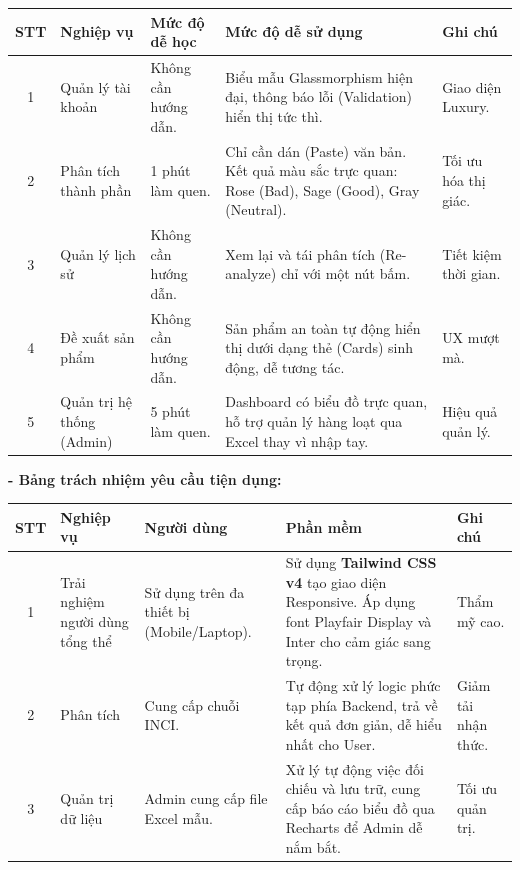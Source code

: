 \documentclass[12pt,a4paper]{article}
\begin{document}
\begin{center}
\renewcommand{\arraystretch}{1.3}
\begin{tabular}{|c|p{3.5cm}|p{3cm}|p{4.5cm}|p{2.5cm}|}
\hline
\textbf{STT} & \textbf{Nghiệp vụ} & \textbf{Mức độ dễ học} & \textbf{Mức độ dễ sử dụng} & \textbf{Ghi chú} \\
\hline
1 & Quản lý tài khoản & Không cần hướng dẫn. & Biểu mẫu Glassmorphism hiện đại, thông báo lỗi (Validation) hiển thị tức thì. & Giao diện Luxury. \\
\hline
2 & Phân tích thành phần & 1 phút làm quen. & Chỉ cần dán (Paste) văn bản. Kết quả màu sắc trực quan: Rose (Bad), Sage (Good), Gray (Neutral). & Tối ưu hóa thị giác. \\
\hline
3 & Quản lý lịch sử & Không cần hướng dẫn. & Xem lại và tái phân tích (Re-analyze) chỉ với một nút bấm. & Tiết kiệm thời gian. \\
\hline
4 & Đề xuất sản phẩm & Không cần hướng dẫn. & Sản phẩm an toàn tự động hiển thị dưới dạng thẻ (Cards) sinh động, dễ tương tác. & UX mượt mà. \\
\hline
5 & Quản trị hệ thống (Admin) & 5 phút làm quen. & Dashboard có biểu đồ trực quan, hỗ trợ quản lý hàng loạt qua Excel thay vì nhập tay. & Hiệu quả quản lý. \\
\hline
\end{tabular}
\end{center}

\textbf{- Bảng trách nhiệm yêu cầu tiện dụng:}

\begin{center}
\renewcommand{\arraystretch}{1.3}
\begin{tabular}{|c|p{3.5cm}|p{3.5cm}|p{4.5cm}|p{2cm}|}
\hline
\textbf{STT} & \textbf{Nghiệp vụ} & \textbf{Người dùng} & \textbf{Phần mềm} & \textbf{Ghi chú} \\
\hline
1 & Trải nghiệm người dùng tổng thể & Sử dụng trên đa thiết bị (Mobile/Laptop). & Sử dụng \textbf{Tailwind CSS v4} tạo giao diện Responsive. Áp dụng font Playfair Display và Inter cho cảm giác sang trọng. & Thẩm mỹ cao. \\
\hline
2 & Phân tích & Cung cấp chuỗi INCI. & Tự động xử lý logic phức tạp phía Backend, trả về kết quả đơn giản, dễ hiểu nhất cho User. & Giảm tải nhận thức. \\
\hline
3 & Quản trị dữ liệu & Admin cung cấp file Excel mẫu. & Xử lý tự động việc đối chiếu và lưu trữ, cung cấp báo cáo biểu đồ qua Recharts để Admin dễ nắm bắt. & Tối ưu quản trị. \\
\hline
\end{tabular}
\end{center}
\end{document}
